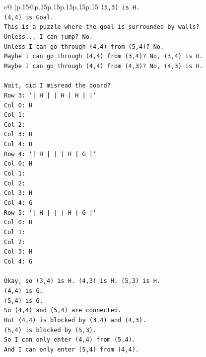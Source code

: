 \documentclass{article}
\begin{document}
{\begin{supertabular}{c@{$\;$}|p{.15\linewidth}@{}p{.15\linewidth}p{.15\linewidth}p{.15\linewidth}p{.15\linewidth}p{.15\linewidth}}
{{{\texttt{(5,3) is H.} \\
\texttt{(4,4) is Goal.} \\
\texttt{This is a puzzle where the goal is surrounded by walls?} \\
\texttt{Unless... I can jump? No.} \\
\texttt{Unless I can go through (4,4) from (5,4)? No.} \\
\texttt{Maybe I can go through (4,4) from (3,4)? No, (3,4) is H.} \\
\texttt{Maybe I can go through (4,4) from (4,3)? No, (4,3) is H.} \\
\\ 
\texttt{Wait, did I misread the board?} \\
\texttt{Row 3: `|  H  |     |  H  |  H  |     |`} \\
\texttt{Col 0: H} \\
\texttt{Col 1:} \\
\texttt{Col 2:} \\
\texttt{Col 3: H} \\
\texttt{Col 4: H} \\
\texttt{Row 4: `|  H  |     |     |  H  |  G  |`} \\
\texttt{Col 0: H} \\
\texttt{Col 1:} \\
\texttt{Col 2:} \\
\texttt{Col 3: H} \\
\texttt{Col 4: G} \\
\texttt{Row 5: `|  H  |     |     |  H  |  G  |`} \\
\texttt{Col 0: H} \\
\texttt{Col 1:} \\
\texttt{Col 2:} \\
\texttt{Col 3: H} \\
\texttt{Col 4: G} \\
\\ 
\texttt{Okay, so (3,4) is H. (4,3) is H. (5,3) is H.} \\
\texttt{(4,4) is G.} \\
\texttt{(5,4) is G.} \\
\texttt{So (4,4) and (5,4) are connected.} \\
\texttt{But (4,4) is blocked by (3,4) and (4,3).} \\
\texttt{(5,4) is blocked by (5,3).} \\
\texttt{So I can only enter (4,4) from (5,4).} \\
\texttt{And I can only enter (5,4) from (4,4).} \\
}}}
\end{supertabular}}
\end{document}
